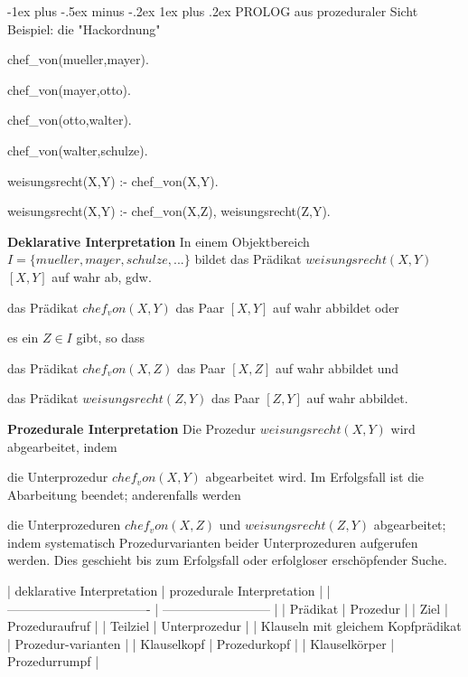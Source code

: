 \documentclass[a4paper]{article}
\makeatletter
\renewcommand{\note}[2]{\begin{noteBox} \textbf{#1} #2 \end{noteBox}}
\renewcommand{\subsubsection}{\@startsection{subsubsection}{3}{0mm}%
                {-1ex plus -.5ex minus -.2ex}%
                {1ex plus .2ex}%
                {\normalfont\small\bfseries}}
\makeatother
\begin{document}
\begin{multicols}{3}
  \subsubsection{PROLOG aus prozeduraler Sicht}
  Beispiel: die "Hackordnung"
  \begin{enumerate*}
    \item chef\_von(mueller,mayer).
    \item chef\_von(mayer,otto).
    \item chef\_von(otto,walter).
    \item chef\_von(walter,schulze).
    \item weisungsrecht(X,Y) :- chef\_von(X,Y).
    \item weisungsrecht(X,Y) :- chef\_von(X,Z), weisungsrecht(Z,Y).
  \end{enumerate*}

  \note{Deklarative Interpretation}{In einem Objektbereich $I=\{mueller, mayer, schulze, ...\}$ bildet das Prädikat $weisungsrecht(X,Y)$ $[X,Y]$ auf wahr ab, gdw.
    \begin{itemize*}
      \item das Prädikat $chef_von(X,Y)$ das Paar $[X,Y]$ auf wahr abbildet oder
      \item es ein $Z\in I$ gibt, so dass
      \begin{itemize*}
        \item das Prädikat $chef_von(X,Z)$ das Paar $[X,Z]$ auf wahr abbildet und
        \item das Prädikat $weisungsrecht(Z,Y)$ das Paar $[Z,Y]$ auf wahr abbildet.
      \end{itemize*}
    \end{itemize*}
  }

  \note{Prozedurale Interpretation}{Die Prozedur $weisungsrecht(X,Y)$ wird abgearbeitet, indem
    \begin{enumerate*}
      \item die Unterprozedur $chef_von(X,Y)$ abgearbeitet wird. Im Erfolgsfall ist die Abarbeitung beendet; anderenfalls werden
      \item die Unterprozeduren $chef_von(X,Z)$ und $weisungsrecht(Z,Y)$ abgearbeitet; indem systematisch Prozedurvarianten beider Unterprozeduren aufgerufen werden. Dies geschieht bis zum Erfolgsfall oder erfolgloser erschöpfender Suche.
    \end{enumerate*}
  }


  | deklarative Interpretation         | prozedurale Interpretation |
  | ---------------------------------- | -------------------------- |
  | Prädikat                           | Prozedur                   |
  | Ziel                               | Prozeduraufruf             |
  | Teilziel                           | Unterprozedur              |
  | Klauseln mit gleichem Kopfprädikat | Prozedur-varianten         |
  | Klauselkopf                        | Prozedurkopf               |
  | Klauselkörper                      | Prozedurrumpf              |


\end{multicols}
\end{document}
